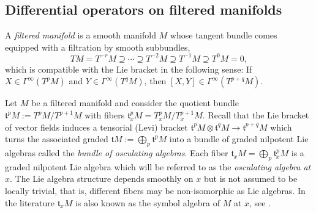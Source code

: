 \documentclass[reqno,12pt]{amsart}
\theoremstyle{plain}
\theoremstyle{definition}
\begin{document}
\subsection{Differential operators on filtered manifolds}\label{SS:DO}








A \emph{filtered manifold} \cite{M93,M02,N10} is a smooth manifold $M$ whose tangent bundle comes equipped with a filtration by smooth subbundles,
$$
TM=T^{-r}M\supseteq\cdots\supseteq T^{-2}M\supseteq T^{-1}M\supseteq T^0M=0,
$$
which is compatible with the Lie bracket in the following sense:
If $X\in\Gamma^\infty(T^pM)$ and $Y\in\Gamma^\infty(T^qM)$, then $[X,Y]\in\Gamma^\infty(T^{p+q}M)$.


Let $M$ be a filtered manifold and consider the quotient bundle $\mathfrak t^pM:=T^pM/T^{p+1}M$ with fibers $\mathfrak t_x^pM=T^p_xM/T^{p+1}_xM$.
Recall that the Lie bracket of vector fields induces a tensorial (Levi) bracket $\mathfrak t^pM\otimes\mathfrak t^qM\to\mathfrak t^{p+q}M$ which turns the associated graded $\mathfrak tM:=\bigoplus_p\mathfrak t^pM$ into a bundle of graded nilpotent Lie algebras called the \emph{bundle of osculating algebras}.
Each fiber $\mathfrak t_xM=\bigoplus_p\mathfrak t^p_xM$ is a graded nilpotent Lie algebra which will be referred to as the \emph{osculating algebra at $x$}.
The Lie algebra structure depends smoothly on $x$ but is not assumed to be locally trivial, that is, different fibers may be non-isomorphic as Lie algebras.
In the literature $\mathfrak t_xM$ is also known as the symbol algebra of $M$ at $x$, see \cite{M93,M02,N10}.
\end{document}

